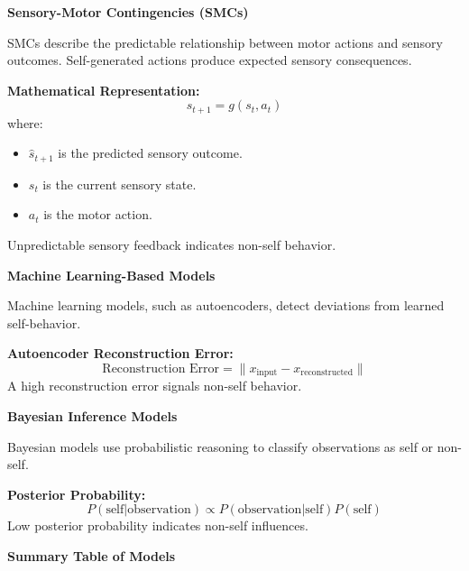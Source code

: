 \documentclass{book}
\providecommand{\ProjectDeepHeading}[2]{%
    \par\medskip\noindent\textbf{#2}\par\smallskip
}
\begin{document}
\ProjectDeepHeading{1}{Sensory-Motor Contingencies (SMCs)}
SMCs describe the predictable relationship between motor actions and sensory outcomes. Self-generated actions produce expected sensory consequences.

\textbf{Mathematical Representation:}
\begin{equation}
    \hat{s}_{t+1} = g(s_t, a_t)
\end{equation}
where:
\begin{itemize}
    \item \( \hat{s}_{t+1} \) is the predicted sensory outcome.
    \item \( s_t \) is the current sensory state.
    \item \( a_t \) is the motor action.
\end{itemize}
Unpredictable sensory feedback indicates non-self behavior.

\ProjectDeepHeading{1}{Machine Learning-Based Models}
Machine learning models, such as autoencoders, detect deviations from learned self-behavior.

\textbf{Autoencoder Reconstruction Error:}
\begin{equation}
    \text{Reconstruction Error} = \| x_{\text{input}} - x_{\text{reconstructed}} \|
\end{equation}
A high reconstruction error signals non-self behavior.

\ProjectDeepHeading{1}{Bayesian Inference Models}
Bayesian models use probabilistic reasoning to classify observations as self or non-self.

\textbf{Posterior Probability:}
\begin{equation}
    P(\text{self} | \text{observation}) \propto P(\text{observation} | \text{self}) P(\text{self})
\end{equation}
Low posterior probability indicates non-self influences.

\ProjectDeepHeading{2}{Summary Table of Models}
\end{document}

